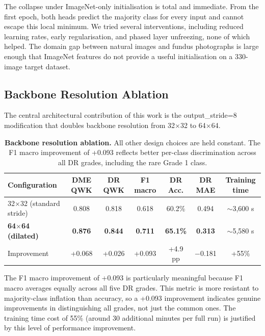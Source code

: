 \documentclass[12pt,a4paper]{article}
\begin{document}
The collapse under ImageNet-only initialisation is total and immediate. From the first epoch, both heads predict the majority class for every input and cannot escape this local minimum. We tried several interventions, including reduced learning rates, early regularisation, and phased layer unfreezing, none of which helped. The domain gap between natural images and fundus photographs is large enough that ImageNet features do not provide a useful initialisation on a 330-image target dataset.

\subsection{Backbone Resolution Ablation}

The central architectural contribution of this work is the output\_stride=8 modification that doubles backbone resolution from 32$\times$32 to 64$\times$64.

\begin{table}[H]
\centering
\scriptsize
\caption{\textbf{Backbone resolution ablation.} All other design choices are held constant. The F1 macro improvement of +0.093 reflects better per-class discrimination across all DR grades, including the rare Grade 1 class.}
\begin{tabular}{|l|c|c|c|c|c|c|}
\hline
\textbf{Configuration} & \textbf{DME QWK} & \textbf{DR QWK} & \textbf{F1 macro} & \textbf{DR Acc.} & \textbf{DR MAE} & \textbf{Training time} \\
\hline
32$\times$32 (standard stride) & 0.808 & 0.818 & 0.618 & 60.2\% & 0.494 & $\sim$3,600 s \\
\textbf{64$\times$64 (dilated)} & \textbf{0.876} & \textbf{0.844} & \textbf{0.711} & \textbf{65.1\%} & \textbf{0.313} & $\sim$5,580 s \\
\hline
Improvement & +0.068 & +0.026 & +0.093 & +4.9 pp & $-$0.181 & +55\% \\
\hline
\end{tabular}
\end{table}

The F1 macro improvement of +0.093 is particularly meaningful because F1 macro averages equally across all five DR grades. This metric is more resistant to majority-class inflation than accuracy, so a +0.093 improvement indicates genuine improvements in distinguishing all grades, not just the common ones. The training time cost of 55\% (around 30 additional minutes per full run) is justified by this level of performance improvement.
\end{document}

